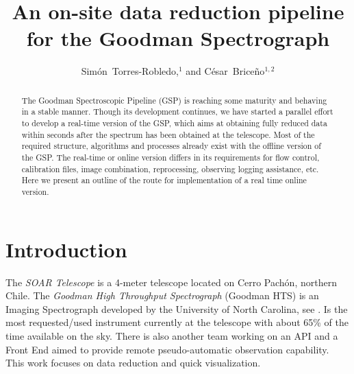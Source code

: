 \documentclass[11pt,twoside]{article}
\begin{document}
\title{An on-site data reduction pipeline for the Goodman Spectrograph}


\author{Sim\'on~Torres-Robledo,$^1$ and C\'esar~Brice\~no$^{1,2}$
  }           %



  
\begin{abstract}

The Goodman Spectroscopic Pipeline (GSP) is reaching some maturity and
behaving in a stable manner. Though its development continues, we have
started a parallel effort to develop a real-time version of the GSP,
which aims at obtaining fully reduced data within seconds after the spectrum
has been obtained at the telescope.  Most of the required structure, algorithms and
processes already exist with the offline version of the GSP. The real-time or online
version differs in its requirements for flow control, calibration files, image combination, reprocessing, observing logging assistance, etc.
Here we present an outline of the route for implementation of a real time online version.
  
\end{abstract}

\section{Introduction}

The \emph{SOAR Telescope} is a 4-meter telescope located on Cerro Pach\'on, northern Chile. The \emph{Goodman High Throughput Spectrograph} (Goodman HTS) is an Imaging Spectrograph developed by the University of North Carolina, see \citet{2004SPIE.5492..331C}. Is the most requested/used instrument currently at the telescope with about 65\% of the time available on the sky. There is also another team working on an API and a Front End aimed to provide remote pseudo-automatic observation capability. This work focuses on data reduction and quick visualization.
\end{document}

